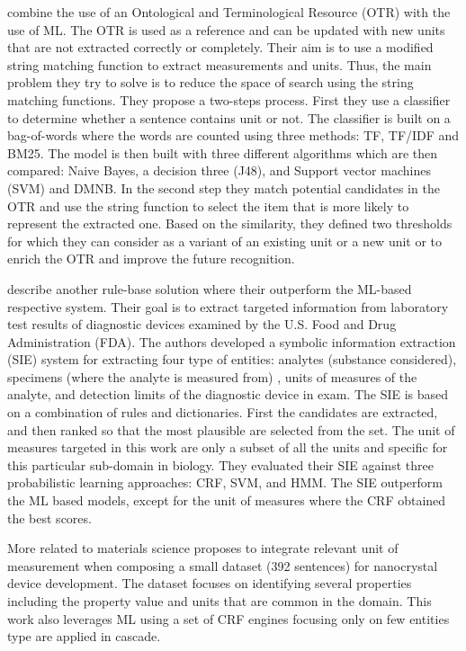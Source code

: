 \documentclass[12pt, a4paper]{report}
\begin{document}
\cite{berrahou2013extract} combine the use of an Ontological and
Terminological Resource (OTR) with the use of ML.
The OTR is used as a reference and can be updated with new units that are not extracted correctly or completely. 
Their aim is to use a modified string matching function to extract measurements and units. Thus, the main problem they try to solve is to  reduce the space of search using the string matching functions. 
They propose a two-steps process. 
First they use a classifier to determine whether a sentence contains unit or not. The classifier is built on a bag-of-words where the words are counted using three methods: TF, TF/IDF and BM25. The model is then built with three different algorithms which are then compared: Naive Bayes, a decision three (J48), and Support vector machines (SVM) and DMNB.
In the second step they match potential candidates in the OTR and use the string function to select the item that is more likely to represent the extracted one. Based on the similarity, they defined two thresholds for which they can consider as a variant of an existing unit or a new unit or to enrich the OTR and improve the future recognition.

\cite{kang_extracting_2013} describe another rule-base solution where their outperform the ML-based respective system. 
Their goal is to extract targeted information from laboratory test results of diagnostic devices examined by  the U.S. Food and Drug Administration (FDA). 
The authors developed a symbolic information extraction (SIE) system for extracting four type of entities: analytes (substance considered), specimens (where the analyte is measured from) , units of measures of the analyte, and detection limits of the diagnostic device in exam.
The SIE is based on a combination of rules and dictionaries. First the candidates are extracted, and then ranked so that the most plausible are selected from the set. The unit of measures targeted in this work are only a subset of all the units and specific for this particular sub-domain in biology. 
They evaluated their SIE against three probabilistic learning approaches: CRF, SVM, and HMM. The SIE outperform the ML based models, except for the unit of measures where the CRF obtained the best scores. 

More related to materials science \cite{dieb2015framework} proposes to integrate relevant unit of measurement when composing a small dataset (392 sentences) for nanocrystal device development. 
The dataset focuses on identifying several properties including the property value and units that are common in the domain. 
This work also leverages ML using a set of CRF engines focusing only on few entities type are applied in cascade. 
\end{document}
